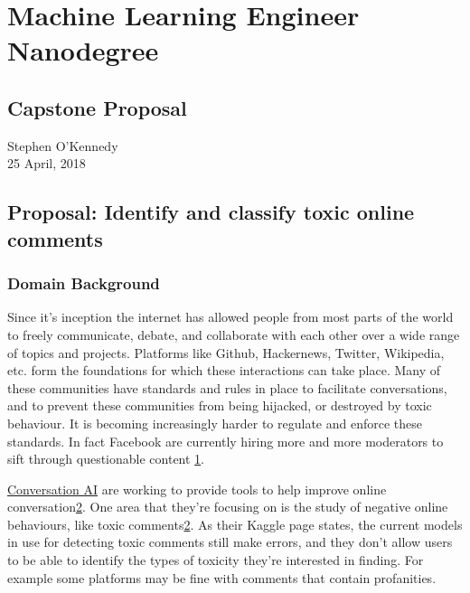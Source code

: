 \hypertarget{machine-learning-engineer-nanodegree}{%
\section{Machine Learning Engineer
Nanodegree}\label{machine-learning-engineer-nanodegree}}

\hypertarget{capstone-proposal}{%
\subsection{Capstone Proposal}\label{capstone-proposal}}

Stephen O'Kennedy\\
25 April, 2018

\hypertarget{proposal-identify-and-classify-toxic-online-comments}{%
\subsection{Proposal: Identify and classify toxic online
comments}\label{proposal-identify-and-classify-toxic-online-comments}}

\hypertarget{domain-background}{%
\subsubsection{Domain Background}\label{domain-background}}

Since it's inception the internet has allowed people from most parts of
the world to freely communicate, debate, and collaborate with each other
over a wide range of topics and projects. Platforms like Github,
Hackernews, Twitter, Wikipedia, etc. form the foundations for which
these interactions can take place. Many of these communities have
standards and rules in place to facilitate conversations, and to prevent
these communities from being hijacked, or destroyed by toxic behaviour.
It is becoming increasingly harder to regulate and enforce these
standards. In fact Facebook are currently hiring more and more
moderators to sift through questionable content
\href{http://fortune.com/2018/03/22/human-moderators-facebook-youtube-twitter/}{1}.

\href{https://conversationai.github.io/}{Conversation AI} are working to
provide tools to help improve online
conversation\href{https://www.kaggle.com/c/jigsaw-toxic-comment-classification-challenge}{2}.
One area that they're focusing on is the study of negative online
behaviours, like toxic
comments\href{https://www.kaggle.com/c/jigsaw-toxic-comment-classification-challenge}{2}.
As their Kaggle page states, the current models in use for detecting
toxic comments still make errors, and they don't allow users to be able
to identify the types of toxicity they're interested in finding. For
example some platforms may be fine with comments that contain
profanities.

